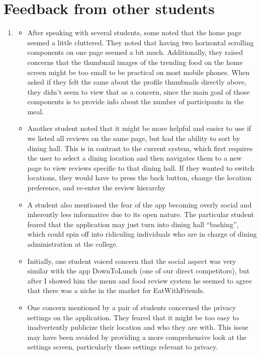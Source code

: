 \documentclass[5pt]{article} %
\begin{document}
\clearpage
\section{Feedback from other students}
\begin{enumerate}
\item
\begin{itemize}
\item After speaking with several students, some noted that the home page seemed a little cluttered.  They noted that having two horizontal scrolling components on one page seemed a bit much.  Additionally, they raised concerns that the thumbnail images of the trending food on the home screen might be too small to be practical on most mobile phones.  When asked if they felt the same about the profile thumbnails directly above, they didn’t seem to view that as a concern, since the main goal of those components is to provide info about the number of participants in the meal.  
\item Another student noted that it might be more helpful and easier to use if we listed all reviews on the same page, but had the ability to sort by dining hall.  This is in contrast to the current system, which first requires the user to select a dining location and then navigates them to a new page to view reviews specific to that dining hall.  If they wanted to switch locations, they would have to press the back button, change the location preference, and re-enter the review hierarchy
\item A student also mentioned the fear of the app becoming overly social and inherently less informative due to its open nature. The particular student feared that the application may just turn into dining hall “bashing”, which could spin off into ridiculing individuals who are in charge of dining administration at the college. 
\item Initially, one student voiced concern that the social aspect was very similar with the app DownToLunch (one of our direct competitors), but after I showed him the menu and food review system he seemed to agree that there was a niche in the market for EatWithFriends.  
\item One concern mentioned by a pair of students concerned the privacy settings on the application. They feared that it might be too easy to inadvertently publicize their location and who they are with. This issue may have been avoided by providing a more comprehensive look at the settings screen, particularly those settings relevant to privacy. 

\end{itemize}
\end{enumerate}
\end{document}
